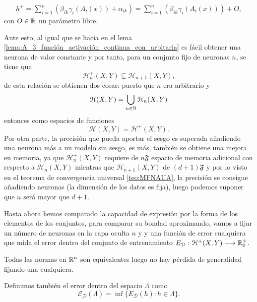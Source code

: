 \begin{aportacionOriginal}
\begin{align}
    h^+ = \sum_{i=1}^{n} \left(\beta_{i k} \gamma_{i}( A_{i}(x)) + \alpha_{i k} \right)
    = \sum_{i=1}^{n} \left(\beta_{i k} \gamma_{i}( A_{i}(x))\right) + O, 
\end{align}
con $O \in \mathbb{R}$ un parámetro libre.

Ante esto, al igual que se hacía en el lema \ref{lema:A_3_función_activación_continua_con_arbitaria}
es fácil obtener una neurona de valor constante y por tanto, para un conjunto fijo de neuronas $n$, se tiene que 
\begin{equation}
    \mathcal{H}^+_n(X,Y) \subsetneq  \mathcal{H}_{n+1}(X,Y),
\end{equation}
de esta relación se obtienen dos cosas: 
puesto que $n$ era arbitrario y 
\begin{equation}
    \mathcal{H}(X,Y) = \bigcup_{n \in \mathbb{N}} \mathcal{H}_n (X,Y)
\end{equation}
entonces como espacios de funciones 
\begin{equation}
    \mathcal{H}(X,Y) = \mathcal{H}^+ (X,Y).
\end{equation}
Por otra parte, la precisión que pueda aportar el sesgo es
superada añadiendo una neurona más a un modelo sin sesgo, es más, también se obtiene una mejora en memoria, ya que 
$\mathcal{H}^+_n(X,Y)$ requiere de $n \mathfrak{F}$ espacio de memoria adicional con respecto a $\mathcal{H}_n(X,Y)$
mientras que $\mathcal{H}_{n+1}(X,Y)$ de $(d +1) \mathfrak{F}$
y por lo visto en el teorema de convergencia universal \ref{teo:MFNAUA}, la precisión se consigue añadiendo neuronas (la dimensión de los datos es fija),
luego podemos suponer que $n$ será mayor que $d+1$. 

Hasta ahora hemos comparado la capacidad de expresión 
por la forma de los elementos de los conjuntos, para comparar su bondad aproximando, vamos a fijar  un 
 número de neuronas en la capa oculta $n$ y 
 y una función de error cualquiera que mida el error dentro 
 del conjunto de entrenamiento
 $E_{\mathcal{D}}:\mathcal{H}^+(X,Y) \longrightarrow \mathbb{R}^+_0$.
 
 Todas las normas en $\mathbb{R}^n$ son equivalentes luego no hay pérdida de generalidad fijando una cualquiera.  

 Definimos también el error dentro del espacio $\Lambda$ como 
 \begin{equation}
    \mathcal{E}_{\mathcal{D}} (\Lambda)
    = \inf \{ E_{\mathcal{D}}(h) : h \in \Lambda\}.
 \end{equation}


\end{aportacionOriginal}

